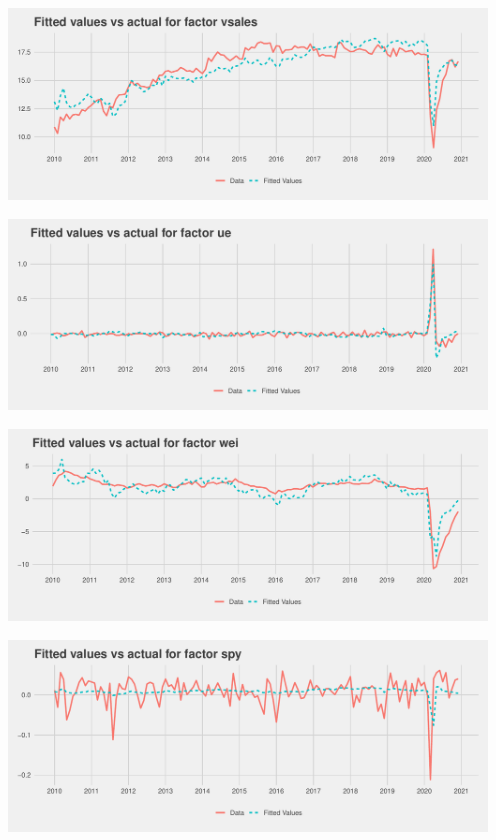 \documentclass[11pt, letterpaper]{article}\usepackage[]{graphicx}\usepackage[]{color}
\begin{document}
{\centering \includegraphics[width=5in,height=2in]{figure/unnamed-chunk-20-11} 

}




{\centering \includegraphics[width=5in,height=2in]{figure/unnamed-chunk-20-12} 

}




{\centering \includegraphics[width=5in,height=2in]{figure/unnamed-chunk-20-13} 

}




{\centering \includegraphics[width=5in,height=2in]{figure/unnamed-chunk-20-14} 

}
\end{document}
